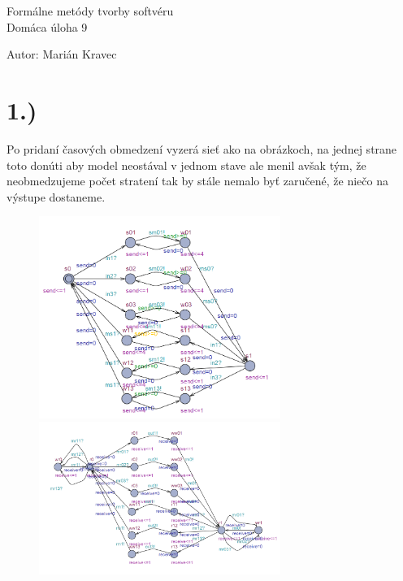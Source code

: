 \documentclass[a4paper]{article}
\begin{document}
 
	
\pagestyle{plain}

\begin{center}
	\sc\large
	Formálne metódy tvorby softvéru\\
	Domáca úloha 9
\end{center}

Autor: Marián Kravec


\section{1.)}

Po pridaní časových obmedzení vyzerá sieť ako na obrázkoch, na jednej strane toto donúti aby model neostával v jednom stave ale menil avšak tým, že neobmedzujeme počet stratení tak by stále nemalo byť zaručené, že niečo na výstupe dostaneme.
\begin{figure}[!h]
	\centering
	\includegraphics[width=0.7\textwidth]{s.png}
	\includegraphics[width=0.7\textwidth]{r.png}
\end{figure}
\newpage
\end{document}
